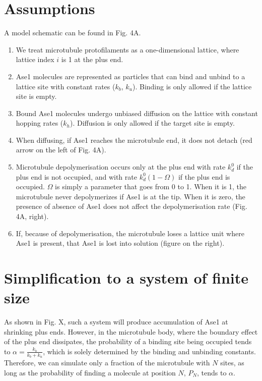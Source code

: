 \documentclass{article}
\begin{document}
\section{Assumptions}
A model schematic can be found in Fig. 4A.

\begin{enumerate}
	\item We treat microtubule protofilaments as a one-dimensional lattice, where lattice index $i$ is 1 at the plus end.
	\item Ase1 molecules are represented as particles that can bind and unbind to a lattice site with constant rates ($k_b$, $k_u$). Binding is only allowed if the lattice site is empty.
	\item Bound Ase1 molecules undergo unbiased diffusion on the lattice with constant hopping rates ($k_h$). Diffusion is only allowed if the target site is empty.
	\item When diffusing, if Ase1 reaches the microtubule end, it does not detach (red arrow on the left of Fig. 4A).
	\item Microtubule depolymerisation occurs only at the plus end with rate $k_d^0$ if the plus end is not occupied, and with rate $k_d^0(1-\Omega)$ if the plus end is occupied. $\Omega$ is simply a parameter that goes from 0 to 1. When it is 1, the microtubule never depolymerizes if Ase1 is at the tip. When it is zero, the presence of absence of Ase1 does not affect the depolymerisation rate (Fig. 4A, right).
	\item If, because of depolymerisation, the microtubule loses a lattice unit where Ase1 is present, that Ase1 is lost into solution (figure on the right).
\end{enumerate}

\section{Simplification to a system of finite size}

As shown in Fig. X, such a system will produce accumulation of Ase1 at shrinking plus ends. However, in the microtubule body, where the boundary effect of the plus end dissipates, the probability of a binding site being occupied tends to $\alpha=\frac{k_b}{k_b+k_u}$, which is solely determined by the binding and unbinding constants.
Therefore, we can simulate only a fraction of the microtubule with $N$ sites, as long as the probability of finding a molecule at position $N$, $P_N$, tends to $\alpha$.
\end{document}
